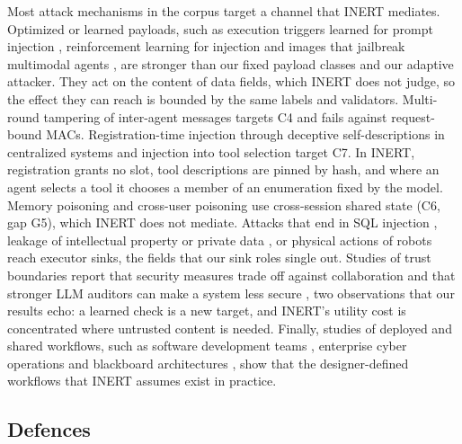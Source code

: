 \documentclass[pdflatex,sn-mathphys-num]{sn-jnl}
\theoremstyle{thmstyleone}%
\theoremstyle{thmstyletwo}%
\theoremstyle{thmstylethree}%
\begin{document}
Most attack mechanisms in the corpus target a channel that INERT mediates. Optimized or learned payloads, such as execution triggers learned for prompt injection \citep{Pasquini2024NeuralELAL}, reinforcement learning for injection \citep{Wen2025RLIAU} and images that jailbreak multimodal agents \citep{Gu2024AgentSAAO}, are stronger than our fixed payload classes and our adaptive attacker. They act on the content of data fields, which INERT does not judge, so the effect they can reach is bounded by the same labels and validators. Multi-round tampering of inter-agent messages \citep{Yan2025AttackTMAQ} targets C4 and fails against request-bound MACs. Registration-time injection through deceptive self-descriptions in centralized systems \citep{Yu2026MisleadingTPO} and injection into tool selection \citep{Shi2025PromptIAR} target C7. In INERT, registration grants no slot, tool descriptions are pinned by hash, and where an agent selects a tool it chooses a member of an enumeration fixed by the model. Memory poisoning \citep{Chen2024AgentPoisonRLBS,Sunil2026MemoryPABF} and cross-user poisoning \citep{Patlan2025CrossUserPUAK} use cross-session shared state (C6, gap G5), which INERT does not mediate. Attacks that end in SQL injection \citep{Pedro2023FromPIBE}, leakage of intellectual property \citep{Wang2025IPLAX} or private data \citep{Kao2026YouTMAZ}, or physical actions of robots \citep{Nagaraja2026WhenPCBF} reach executor sinks, the fields that our sink roles single out. Studies of trust boundaries report that security measures trade off against collaboration \citep{peigne2025securitytax} and that stronger LLM auditors can make a system less secure \citep{Liu2026TheCPT}, two observations that our results echo: a learned check is a new target, and INERT's utility cost is concentrated where untrusted content is needed. Finally, studies of deployed and shared workflows, such as software development teams \citep{Wang2025ShadowsITAL}, enterprise cyber operations \citep{Mitra2026AgenticCyOpsSMAH} and blackboard architectures \citep{Nakamura2025TerrariumRTAR}, show that the designer-defined workflows that INERT assumes exist in practice.

\subsection{Defences}
\end{document}

